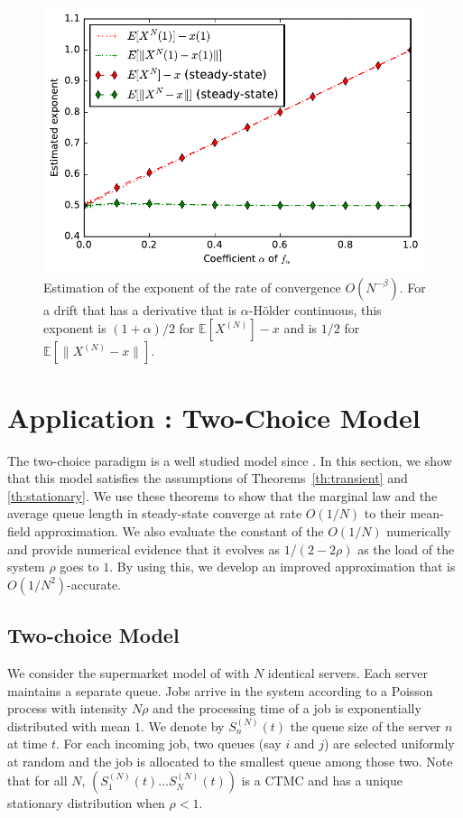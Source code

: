 \documentclass[sigconf]{acmart}
\newcommand\SN{S^{(N)}}
\newcommand\XN{X^{(N)}}
\newcommand\sesp[1]{\mathbb{E}[#1]}
\newcommand\snorm[1]{\|#1\|}
\begin{document}
\begin{figure}[ht]
  \centering
  \includegraphics[width=\linewidth]{exponent_birthDeath}
  \caption{Estimation of the exponent of the rate of convergence
    $O(N^{-\beta})$. For a drift that has a derivative that is
    $\alpha$-Hölder continuous, this exponent is $(1+\alpha)/2$ for
    $\sesp{\XN}-x$ and is $1/2$ for $\sesp{\snorm{\XN-x}}$.}
  \label{fig:expo_BD}
\end{figure}


\section{Application : Two-Choice Model}
\label{sec:two-choice}

The two-choice paradigm is a well studied model since
\cite{mitzenmacher1996power,vvedenskaya1996queueing}. In this section,
we show that this model satisfies the assumptions of
Theorems~\ref{th:transient} and \ref{th:stationary}. We use these
theorems to show that the marginal law and the average queue length in
steady-state converge at rate $O(1/N)$ to their mean-field
approximation. We also evaluate the constant of the $O(1/N)$
numerically and provide numerical evidence that it evolves as
$1/(2-2\rho)$ as the load of the system $\rho$ goes to $1$. By using
this, we develop an improved approximation that is
$O(1/N^2)$-accurate.


\subsection{Two-choice Model}
\label{sec:two-choice-model}

We consider the supermarket model of \cite{mitzenmacher1996power} with
$N$ identical servers. Each server maintains a separate queue. Jobs
arrive in the system according to a Poisson process with intensity
$N\rho$ and the processing time of a job is exponentially distributed
with mean $1$. We denote by $\SN_n(t)$ the queue size of the server
$n$ at time $t$. For each incoming job, two queues (say $i$ and $j$)
are selected uniformly at random and the job is allocated to the
smallest queue among those two. Note that for all $N$,
$(\SN_1(t)\dots \SN_N(t))$ is a CTMC and has a unique stationary
distribution when $\rho<1$.
\end{document}
